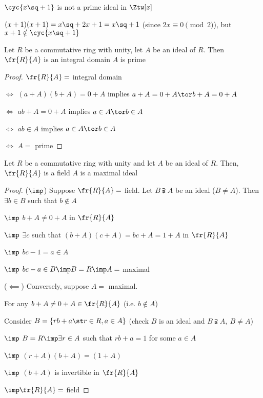 \begin{example}
  \( \cyc{x\sq + 1} \) is not a prime ideal in \( \Ztw[x] \)
  \begin{note}
    \( (x+1)(x+1) = x\sq + 2x + 1 = x\sq + 1 \) (since \( 2x\equiv 0\pmod 2 \)), but \( x+1 \notin\cyc{x\sq+1} \)
  \end{note}
\end{example}

\begin{theorem}
  Let \( R \) be a commutative ring with unity, let \( A \) be an ideal of \( R \). Then \( \fr{R}{A} \) is an integral domain \iff \( A \) is prime
\end{theorem}

\begin{proof}
  \( \fr{R}{A} = \) integral domain

  \( \iff \) \( (a+A)(b+A) = 0+A \) implies \( a+A = 0+A \tor b+A = 0+A \)

  \( \iff \) \( ab+A = 0+A \) implies \( a\in A \tor b\in A \)

  \( \iff \) \( ab\in A \) implies \( a\in A \tor b\in A \)

  \( \iff \) \( A = \) prime
\end{proof}

\begin{theorem}
  Let \( R \) be a commutative ring with unity and let \( A \) be an ideal of \( R \). Then, \( \fr{R}{A} \) is a field \iff \( A \) is a maximal ideal
\end{theorem}

\begin{proof}
  (\( \imp \)) Suppose \( \fr{R}{A} = \) field. Let \( B\supsetneqq A \) be an ideal (\( B\neq A \)). Then \( \exists b \in B \) such that \( b\not\in A \)

    \( \imp \) \( b+A \neq 0+A \) in \( \fr{R}{A} \)

    \( \imp \) \( \exists c \) such that \( (b+A)(c+A) = bc+A = 1+A \) in \( \fr{R}{A} \)

    \( \imp \) \( bc-1 = a \in A \)

    \( \imp \) \( bc-a \in B \imp B = R \imp A = \) maximal

    (\( \impliedby \)) Conversely, suppose \( A = \) maximal.

    For any \( b+A \neq 0+A \in\fr{R}{A} \) (i.e. \( b\not\in A \))

    Consider \( B = \{rb+a \st r\in R, a\in A\} \) (check \( B \) is an ideal and \( B\supsetneqq A,\ B\neq A \))

    \( \imp \) \( B = R \imp \exists r\in A \) such that \( rb+a = 1 \) for some \( a\in A \)

    \( \imp \) \( (r+A)(b+A) = (1+A) \)

    \( \imp \) \( (b+A) \) is invertible in \( \fr{R}{A} \)

    \( \imp \fr{R}{A} = \) field
\end{proof}

